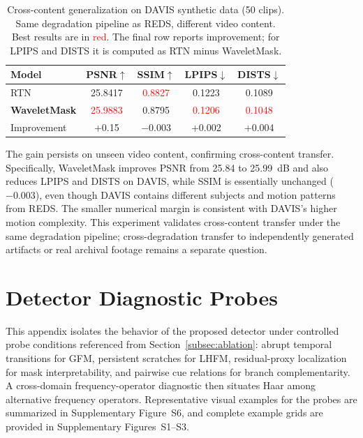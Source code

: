 \documentclass[applsci,article,submit,pdftex,moreauthors]{Definitions/mdpi}
\begin{document}
\begin{table}[H]
\caption{Cross-content generalization on DAVIS synthetic data (50 clips). Same degradation pipeline as REDS, different video content. Best results are in \textcolor{red}{red}. The final row reports improvement; for LPIPS and DISTS it is computed as RTN minus WaveletMask.\label{tab:davis_cross_content}}
\begin{tabularx}{\textwidth}{lCCCC}
\toprule
\textbf{Model} & \textbf{PSNR$\uparrow$} & \textbf{SSIM$\uparrow$} & \textbf{LPIPS$\downarrow$} & \textbf{DISTS$\downarrow$} \\
\midrule
RTN & 25.8417 & \textcolor{red}{0.8827} & 0.1223 & 0.1089 \\
\textbf{WaveletMask} & \textcolor{red}{25.9883} & 0.8795 & \textcolor{red}{0.1206} & \textcolor{red}{0.1048} \\
\midrule
Improvement & +0.15 & $-$0.003 & +0.002 & +0.004 \\
\bottomrule
\end{tabularx}
\end{table}

The gain persists on unseen video content, confirming cross-content transfer. Specifically, WaveletMask improves PSNR from 25.84 to 25.99~dB and also reduces LPIPS and DISTS on DAVIS, while SSIM is essentially unchanged ($-0.003$), even though DAVIS contains different subjects and motion patterns from REDS. The smaller numerical margin is consistent with DAVIS's higher motion complexity. This experiment validates cross-content transfer under the same degradation pipeline; cross-degradation transfer to independently generated artifacts or real archival footage remains a separate question.
 \section{Detector Diagnostic Probes}\label{app:diagnostics}

This appendix isolates the behavior of the proposed detector under controlled probe conditions referenced from Section~\ref{subsec:ablation}: abrupt temporal transitions for GFM, persistent scratches for LHFM, residual-proxy localization for mask interpretability, and pairwise cue relations for branch complementarity. A cross-domain frequency-operator diagnostic then situates Haar among alternative frequency operators. Representative visual examples for the probes are summarized in Supplementary Figure~S6, and complete example grids are provided in Supplementary Figures~S1--S3.
\end{document}
